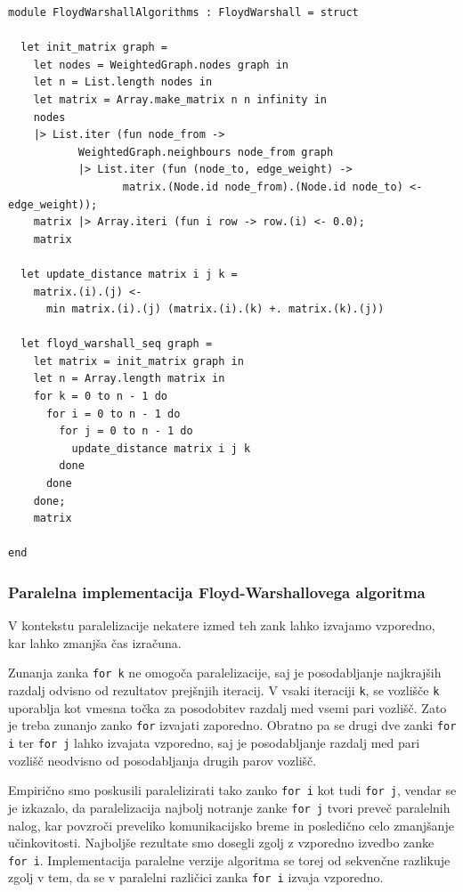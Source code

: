 \documentclass[fin1, tisk]{fmfdelo}
\begin{document}
\begin{lstlisting}[label=lst:floyd_warshall_seq]
module FloydWarshallAlgorithms : FloydWarshall = struct

  let init_matrix graph =
    let nodes = WeightedGraph.nodes graph in
    let n = List.length nodes in
    let matrix = Array.make_matrix n n infinity in
    nodes
    |> List.iter (fun node_from ->
           WeightedGraph.neighbours node_from graph
           |> List.iter (fun (node_to, edge_weight) ->
                  matrix.(Node.id node_from).(Node.id node_to) <- edge_weight));
    matrix |> Array.iteri (fun i row -> row.(i) <- 0.0);
    matrix
  
  let update_distance matrix i j k =
    matrix.(i).(j) <- 
      min matrix.(i).(j) (matrix.(i).(k) +. matrix.(k).(j))

  let floyd_warshall_seq graph =
    let matrix = init_matrix graph in
    let n = Array.length matrix in
    for k = 0 to n - 1 do
      for i = 0 to n - 1 do
        for j = 0 to n - 1 do
          update_distance matrix i j k
        done
      done
    done;
    matrix

end
\end{lstlisting}


\subsubsection{Paralelna implementacija Floyd-Warshallovega algoritma}

V kontekstu paralelizacije nekatere izmed teh zank lahko izvajamo vzporedno, kar lahko zmanjša čas izračuna.

Zunanja zanka \texttt{for k} ne omogoča paralelizacije, saj je posodabljanje najkrajših razdalj odvisno od rezultatov
prejšnjih iteracij. V vsaki iteraciji \texttt{k}, se vozlišče \texttt{k} uporablja kot vmesna točka za posodobitev
razdalj med vsemi pari vozlišč. Zato je treba zunanjo zanko \texttt{for} izvajati zaporedno.
Obratno pa se drugi dve zanki \texttt{for i} ter \texttt{for j} lahko izvajata vzporedno, saj je posodabljanje razdalj med pari vozlišč
neodvisno od posodabljanja drugih parov vozlišč.

Empirično smo poskusili paralelizirati tako zanko \texttt{for i} kot tudi \texttt{for j}, vendar se je izkazalo, da paralelizacija najbolj
notranje zanke \texttt{for j} tvori preveč paralelnih nalog, kar povzroči preveliko komunikacijsko breme in posledično
celo zmanjšanje učinkovitosti. Najboljše rezultate smo dosegli zgolj z vzporedno izvedbo zanke \texttt{for i}.
Implementacija paralelne verzije algoritma se torej od sekvenčne razlikuje zgolj v tem, da se v paralelni različici
zanka \texttt{for i} izvaja vzporedno.
\end{document}
